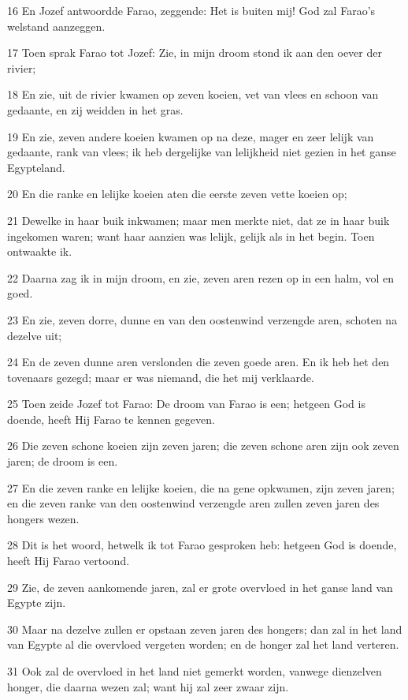 \par 16 En Jozef antwoordde Farao, zeggende: Het is buiten mij! God zal Farao's welstand aanzeggen.
\par 17 Toen sprak Farao tot Jozef: Zie, in mijn droom stond ik aan den oever der rivier;
\par 18 En zie, uit de rivier kwamen op zeven koeien, vet van vlees en schoon van gedaante, en zij weidden in het gras.
\par 19 En zie, zeven andere koeien kwamen op na deze, mager en zeer lelijk van gedaante, rank van vlees; ik heb dergelijke van lelijkheid niet gezien in het ganse Egypteland.
\par 20 En die ranke en lelijke koeien aten die eerste zeven vette koeien op;
\par 21 Dewelke in haar buik inkwamen; maar men merkte niet, dat ze in haar buik ingekomen waren; want haar aanzien was lelijk, gelijk als in het begin. Toen ontwaakte ik.
\par 22 Daarna zag ik in mijn droom, en zie, zeven aren rezen op in een halm, vol en goed.
\par 23 En zie, zeven dorre, dunne en van den oostenwind verzengde aren, schoten na dezelve uit;
\par 24 En de zeven dunne aren verslonden die zeven goede aren. En ik heb het den tovenaars gezegd; maar er was niemand, die het mij verklaarde.
\par 25 Toen zeide Jozef tot Farao: De droom van Farao is een; hetgeen God is doende, heeft Hij Farao te kennen gegeven.
\par 26 Die zeven schone koeien zijn zeven jaren; die zeven schone aren zijn ook zeven jaren; de droom is een.
\par 27 En die zeven ranke en lelijke koeien, die na gene opkwamen, zijn zeven jaren; en die zeven ranke van den oostenwind verzengde aren zullen zeven jaren des hongers wezen.
\par 28 Dit is het woord, hetwelk ik tot Farao gesproken heb: hetgeen God is doende, heeft Hij Farao vertoond.
\par 29 Zie, de zeven aankomende jaren, zal er grote overvloed in het ganse land van Egypte zijn.
\par 30 Maar na dezelve zullen er opstaan zeven jaren des hongers; dan zal in het land van Egypte al die overvloed vergeten worden; en de honger zal het land verteren.
\par 31 Ook zal de overvloed in het land niet gemerkt worden, vanwege dienzelven honger, die daarna wezen zal; want hij zal zeer zwaar zijn.
